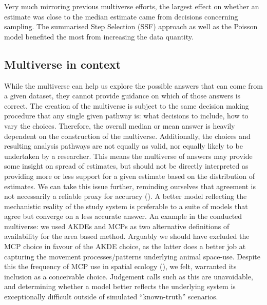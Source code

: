 \documentclass[10pt,a4paper]{article}
\begin{document}
Very much mirroring previous multiverse efforts, the largest effect on whether an estimate was close to the median estimate came from decisions concerning sampling.
The summarised Step Selection (SSF) approach as well as the Poisson model benefited the most from increasing the data quantity.

\subsection{Multiverse in context}\label{multiverse-in-context}

While the multiverse can help us explore the possible answers that can come from a given dataset, they cannot provide guidance on which of those answers is correct.
The creation of the multiverse is subject to the same decision making procedure that any single given pathway is: what decisions to include, how to vary the choices.
Therefore, the overall median or mean answer is heavily dependent on the construction of the multiverse.
Additionally, the choices and resulting analysis pathways are not equally as valid, nor equally likely to be undertaken by a researcher.
This means the multiverse of answers may provide some insight on spread of estimates, but should not be directly interpreted as providing more or less support for a given estimate based on the distribution of estimates.
We can take this issue further, reminding ourselves that agreement is not necessarily a reliable proxy for accuracy ().
A better model reflecting the mechanistic reality of the study system is preferable to a suite of models that agree but converge on a less accurate answer.
An example in the conducted multiverse: we used AKDEs and MCPs as two alternative definitions of availability for the area based method.
Arguably we should have excluded the MCP choice in favour of the AKDE choice, as the latter does a better job at capturing the movement processes/patterns underlying animal space-use.
Despite this the frequency of MCP use in spatial ecology (), we felt, warranted its inclusion as a conceivable choice.
Judgement calls such as this are unavoidable, and determining whether a model better reflects the underlying system is exceptionally difficult outside of simulated ``known-truth'' scenarios.
\end{document}
